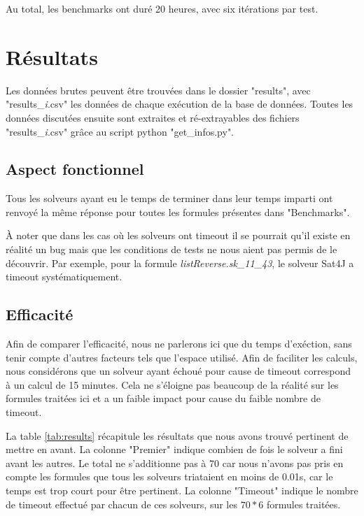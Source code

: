 \documentclass[11pt,a4paper]{article}
\begin{document}
Au total, les benchmarks ont duré 20 heures, avec six itérations par test.


\section{Résultats}

Les données brutes peuvent être trouvées dans le dossier "results", avec "results\_\textit{i}.csv" les données de chaque exécution de la base de données.
Toutes les données discutées ensuite sont extraites et ré-extrayables des fichiers "results\_\textit{i}.csv" grâce au script python "get\_infos.py". 

\subsection{Aspect fonctionnel}

Tous les solveurs ayant eu le temps de terminer dans leur temps imparti ont renvoyé la même réponse pour toutes les formules présentes dans "Benchmarks".

À noter que dans les cas où les solveurs ont timeout il se pourrait qu'il existe en réalité un bug mais que les conditions de tests ne nous aient pas permis de le découvrir. Par exemple, pour la formule \textit{listReverse.sk\_11\_43}, le solveur Sat4J a timeout systématiquement.

\subsection{Efficacité}

Afin de comparer l'efficacité, nous ne parlerons ici que du temps d'exéction, sans tenir compte d'autres facteurs tels que l'espace utilisé. Afin de faciliter les calculs, nous considérons que un solveur ayant échoué pour cause de timeout correspond à un calcul de 15 minutes. Cela ne s'éloigne pas beaucoup de la réalité sur les formules traitées ici et a un faible impact pour cause du faible nombre de timeout.

La table \ref{tab:results} récapitule les résultats que nous avons trouvé pertinent de mettre en avant. 
La colonne "Premier" indique combien de fois le solveur a fini avant les autres. Le total ne s'additionne pas à 70 car nous n'avons pas pris en compte les formules que tous les solveurs triataient en moins de 0.01s, car le temps est trop court pour être pertinent.
La colonne "Timeout" indique le nombre de timeout effectué par chacun de ces solveurs, sur les $70 * 6$ formules traitées. 
\end{document}
